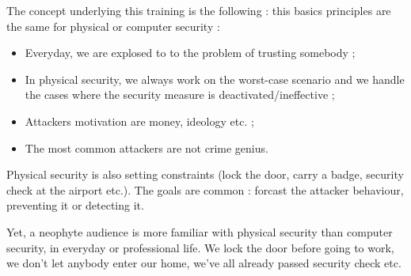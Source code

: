 \documentclass[11pt]{article} %
\begin{document}
The concept underlying this training is the following : this
basics principles are the same for physical or computer security :
\begin{itemize}
\item Everyday, we are explosed to to the problem of trusting somebody ; 
\item In physical security, we always work on the worst-case scenario and we 
handle the cases where the security measure is deactivated/ineffective ; 
\item Attackers motivation are money, ideology etc. ;
\item The most common attackers are not crime genius.
\end{itemize}
%
%

Physical security is also setting constraints (lock the door,
carry a badge, security check at the airport etc.). The goals
are common : forcast the attacker behaviour, preventing it or
detecting it.

Yet, a neophyte audience is more familiar with physical security
than computer security, in everyday or professional life. We
lock the door before going to work, we don't let anybody enter
our home, we've all already passed security check etc.
\end{document}
